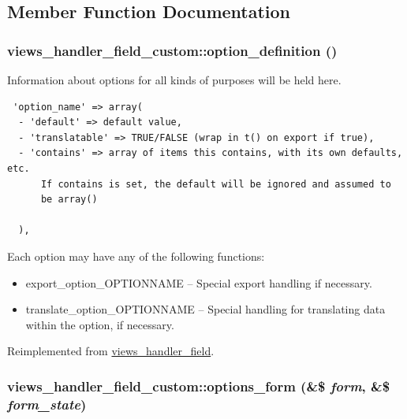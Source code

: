 \subsection{Member Function Documentation}
\hypertarget{classviews__handler__field__custom_4089ad30293453649f51d4a68005bea1}{
\subsubsection[{option\_\-definition}]{\setlength{\rightskip}{0pt plus 5cm}views\_\-handler\_\-field\_\-custom::option\_\-definition ()}}
\label{classviews__handler__field__custom_4089ad30293453649f51d4a68005bea1}


Information about options for all kinds of purposes will be held here. 

\begin{Code}\begin{verbatim} 'option_name' => array(
  - 'default' => default value,
  - 'translatable' => TRUE/FALSE (wrap in t() on export if true),
  - 'contains' => array of items this contains, with its own defaults, etc.
      If contains is set, the default will be ignored and assumed to
      be array()

  ),
\end{verbatim}
\end{Code}

 Each option may have any of the following functions:\begin{itemize}
\item export\_\-option\_\-OPTIONNAME -- Special export handling if necessary.\item translate\_\-option\_\-OPTIONNAME -- Special handling for translating data within the option, if necessary. \end{itemize}


Reimplemented from \hyperlink{classviews__handler__field_64c69a8a3697603f8283405071c25b76}{views\_\-handler\_\-field}.\hypertarget{classviews__handler__field__custom_886688de7d2ac5bc4ef3b588a2e5056a}{
\subsubsection[{options\_\-form}]{\setlength{\rightskip}{0pt plus 5cm}views\_\-handler\_\-field\_\-custom::options\_\-form (\&\$ {\em form}, \/  \&\$ {\em form\_\-state})}}
\label{classviews__handler__field__custom_886688de7d2ac5bc4ef3b588a2e5056a}


